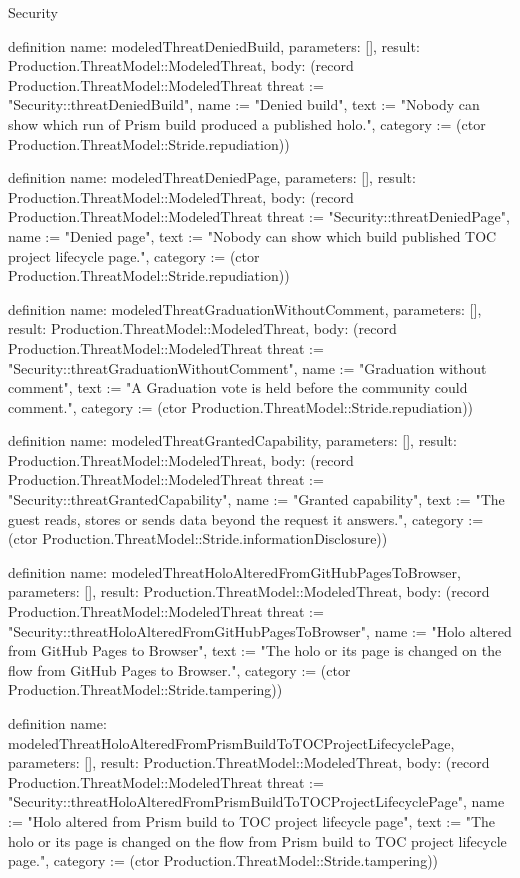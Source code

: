\begin{lexlean}{Security}
\begin{semanticmodule}
definition{
  name: modeledThreatDeniedBuild,
  parameters: [],
  result: Production.ThreatModel::ModeledThreat,
  body: (record Production.ThreatModel::ModeledThreat {threat := "Security::threatDeniedBuild", name := "Denied build", text := "Nobody can show which run of Prism build produced a published holo.", category := (ctor Production.ThreatModel::Stride.repudiation)})
}

definition{
  name: modeledThreatDeniedPage,
  parameters: [],
  result: Production.ThreatModel::ModeledThreat,
  body: (record Production.ThreatModel::ModeledThreat {threat := "Security::threatDeniedPage", name := "Denied page", text := "Nobody can show which build published TOC project lifecycle page.", category := (ctor Production.ThreatModel::Stride.repudiation)})
}

definition{
  name: modeledThreatGraduationWithoutComment,
  parameters: [],
  result: Production.ThreatModel::ModeledThreat,
  body: (record Production.ThreatModel::ModeledThreat {threat := "Security::threatGraduationWithoutComment", name := "Graduation without comment", text := "A Graduation vote is held before the community could comment.", category := (ctor Production.ThreatModel::Stride.repudiation)})
}

definition{
  name: modeledThreatGrantedCapability,
  parameters: [],
  result: Production.ThreatModel::ModeledThreat,
  body: (record Production.ThreatModel::ModeledThreat {threat := "Security::threatGrantedCapability", name := "Granted capability", text := "The guest reads, stores or sends data beyond the request it answers.", category := (ctor Production.ThreatModel::Stride.informationDisclosure)})
}

definition{
  name: modeledThreatHoloAlteredFromGitHubPagesToBrowser,
  parameters: [],
  result: Production.ThreatModel::ModeledThreat,
  body: (record Production.ThreatModel::ModeledThreat {threat := "Security::threatHoloAlteredFromGitHubPagesToBrowser", name := "Holo altered from GitHub Pages to Browser", text := "The holo or its page is changed on the flow from GitHub Pages to Browser.", category := (ctor Production.ThreatModel::Stride.tampering)})
}

definition{
  name: modeledThreatHoloAlteredFromPrismBuildToTOCProjectLifecyclePage,
  parameters: [],
  result: Production.ThreatModel::ModeledThreat,
  body: (record Production.ThreatModel::ModeledThreat {threat := "Security::threatHoloAlteredFromPrismBuildToTOCProjectLifecyclePage", name := "Holo altered from Prism build to TOC project lifecycle page", text := "The holo or its page is changed on the flow from Prism build to TOC project lifecycle page.", category := (ctor Production.ThreatModel::Stride.tampering)})
}


\end{semanticmodule}
\end{lexlean}
